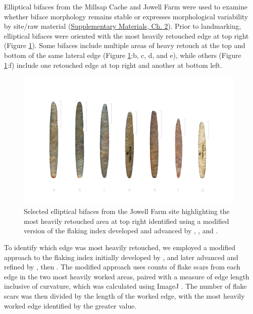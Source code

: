 \documentclass[]{interact}
\theoremstyle{plain}%
\theoremstyle{definition}
\theoremstyle{remark}
\begin{document}
Elliptical bifaces from the Millsap Cache and Jowell Farm were used to
examine whether biface morphology remains stable or expresses
morphological variability by site/raw material
(\href{https://seldenlab.github.io/elliptical.bifaces/gm---siteraw-material.html}{Supplementary
Materials, Ch. 2}). Prior to landmarking, elliptical bifaces were
oriented with the most heavily retouched edge at top right (Figure
\ref{fig:elliptical}). Some bifaces include multiple areas of heavy
retouch at the top and bottom of the same lateral edge (Figure
\ref{fig:elliptical}:b, c, d, and e), while others (Figure
\ref{fig:elliptical}:f) include one retouched edge at top right and
another at bottom left.

\begin{figure}\centering
\includegraphics[width=\linewidth]{figs/ellipticalbifaces.png}
\caption{Selected elliptical bifaces from the Jowell Farm site highlighting the most heavily retouched area at top right identified using a modified version of the flaking index developed and advanced by \citet{RN11099}, \citet{RN9242}, and \citet{RN11098}.}
\label{fig:elliptical}
\end{figure}

To identify which edge was most heavily retouched, we employed a
modified approach to the flaking index initially developed by
\citet{RN11099}, and later advanced and refined by \citet{RN9242}, then
\citet{RN11098}. The modified approach uses counts of flake scars from
each edge in the two most heavily worked areas, paired with a measure of
edge length inclusive of curvature, which was calculated using ImageJ
\citep{RN11146,RN11147,RN11148}. The number of flake scars was then
divided by the length of the worked edge, with the most heavily worked
edge identified by the greater value.
\end{document}
